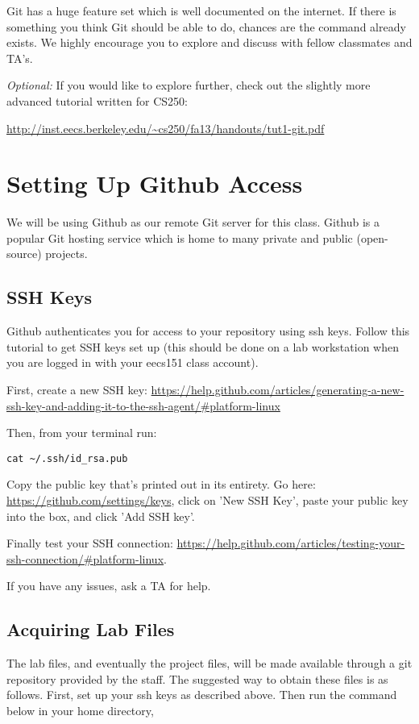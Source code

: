 \documentclass[11pt]{article}
\begin{document}
Git has a huge feature set which is well documented on the internet. If there is something you think Git should be able to do, chances are the command already exists. We highly encourage you to explore and discuss with fellow classmates and TA's.

\textit{Optional:} If you would like to explore further, check out the slightly more advanced tutorial written for CS250:

\url{http://inst.eecs.berkeley.edu/~cs250/fa13/handouts/tut1-git.pdf}

\section{Setting Up Github Access}
We will be using Github as our remote Git server for this class. Github is a popular Git hosting service which is home to many private and public (open-source) projects.

\subsection{SSH Keys}
Github authenticates you for access to your repository using ssh keys. Follow this tutorial to get SSH keys set up (this should be done on a lab workstation when you are logged in with your eecs151 class account).

First, create a new SSH key: \url{https://help.github.com/articles/generating-a-new-ssh-key-and-adding-it-to-the-ssh-agent/#platform-linux}

Then, from your terminal run:
\begin{verbatim}
cat ~/.ssh/id_rsa.pub
\end{verbatim}
Copy the public key that's printed out in its entirety. Go here: \url{https://github.com/settings/keys}, click on 'New SSH Key', paste your public key into the box, and click 'Add SSH key'.

Finally test your SSH connection: \url{https://help.github.com/articles/testing-your-ssh-connection/#platform-linux}.

If you have any issues, ask a TA for help.

\subsection{Acquiring Lab Files}
The lab files, and eventually the project files, will be made available through a git repository provided by the staff. The suggested way to obtain these files is as follows. First, set up your ssh keys as described above. Then run the command below in your home directory,
\end{document}

